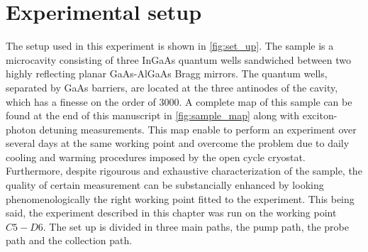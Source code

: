 \section{Experimental setup}
The setup used in this experiment is shown in \autoref{fig:set_up}. The sample is a microcavity consisting of three InGaAs quantum wells sandwiched between two highly reflecting planar GaAs-AlGaAs Bragg mirrors.
The quantum wells, separated by GaAs barriers, are located at the three antinodes of the cavity, which has a finesse on the order of 3000. A complete map of this sample 
 can be found at the end of this manuscript in \autoref{fig:sample_map} along with exciton-photon detuning measurements. This map enable to perform an experiment over several days at the same working point and overcome the problem due to daily cooling and warming procedures imposed by the open cycle cryostat. Furthermore, despite rigourous and exhaustive
 characterization of the sample, the quality of certain measurement can be substancially enhanced by looking phenomenologically the right working point fitted to the experiment. This being said, the experiment described in this chapter was run on the working point $C5-D6$.
 The set up is divided in three main paths, the pump path, the probe path and the collection path.


